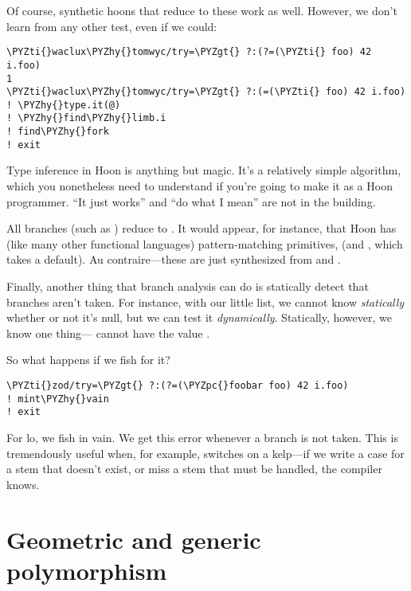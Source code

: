 Of course, synthetic hoons that reduce to these work as well.
However, we don't learn from any other test, even if we could:

\begin{framed_shaded}
\begin{Verbatim}[fontsize=\relsize{-2.5},fontseries=b,commandchars=\\\{\}]
\PYZti{}waclux\PYZhy{}tomwyc/try=\PYZgt{} ?:(?=(\PYZti{} foo) 42 i.foo)
1
\PYZti{}waclux\PYZhy{}tomwyc/try=\PYZgt{} ?:(=(\PYZti{} foo) 42 i.foo)
! \PYZhy{}type.it(@)
! \PYZhy{}find\PYZhy{}limb.i
! find\PYZhy{}fork
! exit
\end{Verbatim}
\end{framed_shaded}
Type inference in Hoon is anything but magic.  It's a relatively
simple algorithm, which you nonetheless need to understand if
you're going to make it as a Hoon programmer.  ``It just works''
and ``do what I mean'' are not in the building.

All branches (such as ) reduce to .  It would appear, for
instance, that Hoon has (like many other functional languages)
pattern-matching primitives,  (and , which takes a
default).  Au contraire---these are just synthesized from 
and .

Finally, another thing that branch analysis can do is statically
detect that branches aren't taken.  For instance, with our little
 list, we cannot know \emph{statically} whether or not it's null,
but we can test it \emph{dynamically}.  Statically, however, we know
one thing--- cannot have the value .

So what happens if we fish for it?

\begin{framed_shaded}
\begin{Verbatim}[fontsize=\relsize{-2.5},fontseries=b,commandchars=\\\{\}]
\PYZti{}zod/try=\PYZgt{} ?:(?=(\PYZpc{}foobar foo) 42 i.foo)
! mint\PYZhy{}vain
! exit
\end{Verbatim}
\end{framed_shaded}
For lo, we fish in vain.  We get this error whenever a branch is
not taken.  This is tremendously useful when, for example, 
switches on a kelp---if we write a case for a stem that doesn't
exist, or miss a stem that must be handled, the compiler knows.

\section{Geometric and generic polymorphism}

